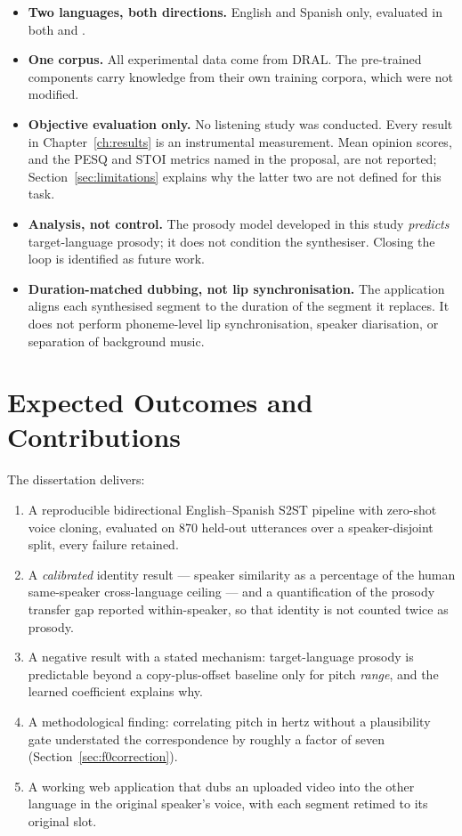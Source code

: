 \begin{itemize}
  \item \textbf{Two languages, both directions.} English and Spanish only, evaluated in both
        \ento{} and \esto{}.
  \item \textbf{One corpus.} All experimental data come from DRAL. The pre-trained components
        carry knowledge from their own training corpora, which were not modified.
  \item \textbf{Objective evaluation only.} No listening study was conducted. Every result in
        Chapter~\ref{ch:results} is an instrumental measurement. Mean opinion scores, and the
        PESQ and STOI metrics named in the proposal, are not reported; Section~\ref{sec:limitations}
        explains why the latter two are not defined for this task.
  \item \textbf{Analysis, not control.} The prosody model developed in this study
        \emph{predicts} target-language prosody; it does not condition the synthesiser. Closing the
        loop is identified as future work.
  \item \textbf{Duration-matched dubbing, not lip synchronisation.} The application aligns each
        synthesised segment to the duration of the segment it replaces. It does not perform
        phoneme-level lip synchronisation, speaker diarisation, or separation of background music.
\end{itemize}

\section{Expected Outcomes and Contributions}
\label{sec:contributions}

The dissertation delivers:

\begin{enumerate}
  \item A reproducible bidirectional English--Spanish S2ST pipeline with zero-shot voice cloning,
        evaluated on 870 held-out utterances over a speaker-disjoint split, every failure retained.
  \item A \emph{calibrated} identity result --- speaker similarity as a percentage of the human
        same-speaker cross-language ceiling --- and a quantification of the prosody transfer gap
        reported within-speaker, so that identity is not counted twice as prosody.
  \item A negative result with a stated mechanism: target-language prosody is predictable beyond a
        copy-plus-offset baseline only for pitch \emph{range}, and the learned coefficient explains
        why.
  \item A methodological finding: correlating pitch in hertz without a plausibility gate understated
        the correspondence by roughly a factor of seven (Section~\ref{sec:f0correction}).
  \item A working web application that dubs an uploaded video into the other language in the
        original speaker's voice, with each segment retimed to its original slot.
\end{enumerate}

